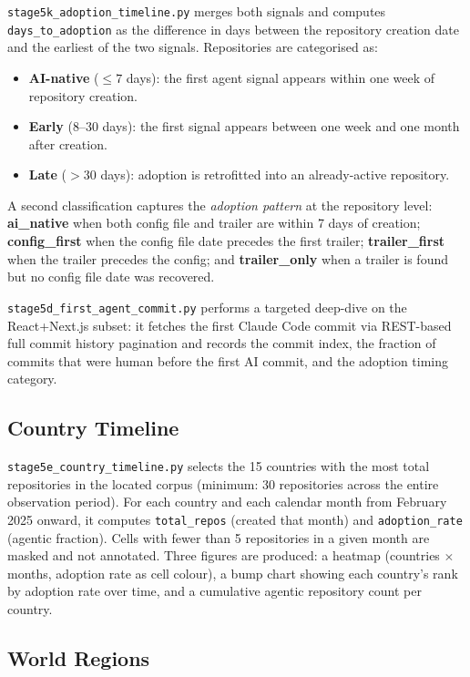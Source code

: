 \texttt{stage5k\_adoption\_timeline.py} merges both signals and computes \texttt{days\_to\_adoption} as the difference in days between the repository creation date and the earliest of the two signals. Repositories are categorised as:

\begin{itemize}
  \item \textbf{AI-native} ($\leq 7$ days): the first agent signal appears within one week of repository creation.
  \item \textbf{Early} (8--30 days): the first signal appears between one week and one month after creation.
  \item \textbf{Late} ($> 30$ days): adoption is retrofitted into an already-active repository.
\end{itemize}

A second classification captures the \emph{adoption pattern} at the repository level: \textbf{ai\_native} when both config file and trailer are within 7 days of creation; \textbf{config\_first} when the config file date precedes the first trailer; \textbf{trailer\_first} when the trailer precedes the config; and \textbf{trailer\_only} when a trailer is found but no config file date was recovered.

\texttt{stage5d\_first\_agent\_commit.py} performs a targeted deep-dive on the React+Next.js subset: it fetches the first Claude Code commit via REST-based full commit history pagination and records the commit index, the fraction of commits that were human before the first AI commit, and the adoption timing category.

\subsection{Country Timeline}

\texttt{stage5e\_country\_timeline.py} selects the 15 countries with the most total repositories in the located corpus (minimum: 30 repositories across the entire observation period). For each country and each calendar month from February 2025 onward, it computes \texttt{total\_repos} (created that month) and \texttt{adoption\_rate} (agentic fraction). Cells with fewer than 5 repositories in a given month are masked and not annotated. Three figures are produced: a heatmap (countries $\times$ months, adoption rate as cell colour), a bump chart showing each country's rank by adoption rate over time, and a cumulative agentic repository count per country.

\subsection{World Regions}

